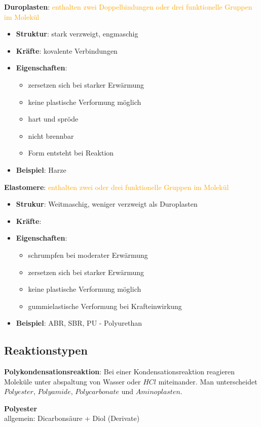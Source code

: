 \textbf{Duroplasten}: \textcolor{orange}{enthalten zwei Doppelbindungen oder drei funktionelle Gruppen im Molekül}
\begin{itemize}
    \item \textbf{Struktur}: stark verzweigt, engmaschig
    \item \textbf{Kräfte}: kovalente Verbindungen
    \item \textbf{Eigenschaften}:
        \begin{itemize}
            \item zersetzen sich bei starker Erwärmung
            \item keine plastische Verformung möglich
            \item hart und spröde
            \item nicht brennbar
            \item Form entsteht bei Reaktion
        \end{itemize}
    \item \textbf{Beispiel}: Harze
\end{itemize}

\textbf{Elastomere}: \textcolor{orange}{enthalten zwei oder drei funktionelle Gruppen im Molekül}
\begin{itemize}
    \item \textbf{Strukur}: Weitmaschig, weniger verzweigt als Duroplasten
    \item \textbf{Kräfte}:
    \item \textbf{Eigenschaften}: 
        \begin{itemize}
            \item schrumpfen bei moderater Erwärmung
            \item zersetzen sich bei starker Erwärmung
            \item keine plastische Verformung möglich
            \item gummielastische Verformung bei Krafteinwirkung
        \end{itemize}
    \item \textbf{Beispiel}: ABR, SBR, PU - Polyurethan
\end{itemize}

\subsection{Reaktionstypen}
\textbf{Polykondensationsreaktion}: Bei einer Kondensationsreaktion reagieren Moleküle unter abspaltung von Wasser oder $HCl$ miteinander. 
Man unterscheidet $Polyester$, $Polyamide$, $Polycarbonate$ und $Aminoplasten$.

\vspace{0.3cm}

\textbf{Polyester} \\
allgemein: Dicarbonsäure + Diol (Derivate)

